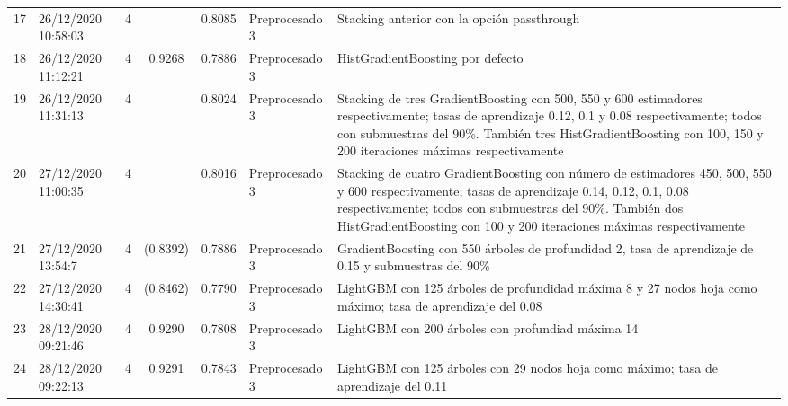 \documentclass[oneside]{book}
\begin{document}
\begin{longtable}{|c|C{2.1cm}|c|c|c|C{4cm}|C{6cm}|}
\midrule

17 & 26/12/2020 10:58:03 & 4 &  & 0.8085 & Preprocesado 3 & Stacking anterior con la opción passthrough \\

\midrule

18 & 26/12/2020 11:12:21 & 4 & 0.9268  & 0.7886 & Preprocesado 3 & HistGradientBoosting por defecto \\

\midrule

19 & 26/12/2020 11:31:13 & 4 & & 0.8024 & Preprocesado 3 & Stacking de tres
GradientBoosting con 500, 550 y 600 estimadores respectivamente; tasas
de aprendizaje 0.12, 0.1 y 0.08 respectivamente; todos con submuestras
del 90\%. También tres HistGradientBoosting con 100, 150 y 200 iteraciones máximas respectivamente \\

\midrule

20 & 27/12/2020 11:00:35 & 4 &  & 0.8016 & Preprocesado 3 & Stacking de cuatro GradientBoosting con número de estimadores 450, 500, 550 y 600 respectivamente; tasas de aprendizaje 0.14, 0.12, 0.1, 0.08 respectivamente; todos con submuestras del 90\%. También dos HistGradientBoosting con 100 y 200 iteraciones máximas respectivamente \\

\midrule

21 & 27/12/2020 13:54:7 & 4 & (0.8392) & 0.7886 & Preprocesado 3 & GradientBoosting con 550 árboles de profundidad 2, tasa de aprendizaje de 0.15 y submuestras del 90\% \\

\midrule

22 & 27/12/2020 14:30:41 & 4 & (0.8462) & 0.7790 & Preprocesado 3 & LightGBM con 125 árboles de profundidad máxima 8 y 27 nodos hoja como máximo; tasa de aprendizaje del 0.08 \\

\midrule

23 & 28/12/2020 09:21:46 & 4 & 0.9290 & 0.7808 & Preprocesado 3 & LightGBM con 200 árboles con profundiad máxima 14 \\

\midrule

24 & 28/12/2020 09:22:13 & 4 & 0.9291 & 0.7843 & Preprocesado 3 & LightGBM con 125 árboles con 29 nodos hoja como máximo; tasa de aprendizaje del 0.11 \\


\end{longtable}
\end{document}
